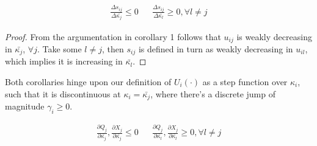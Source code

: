 \documentclass[../main.tex]{subfiles}
\begin{document}
\begin{corollary}
\begin{align*}
    \frac{\Delta s_{ij}}{\Delta\bar{\kappa_{j}}} \leq 0 &&  \frac{\Delta s_{ij}}{\Delta\bar{\kappa_{l}}} \geq 0, \forall l \neq j
\end{align*}   
\end{corollary}

\begin{proof}
From the argumentation in corollary 1 follows that $u_{ij}$ is weakly decreasing in $\bar{\kappa_j}$, $\forall j$. Take some $l \neq j$, then $s_{ij}$ is defined in turn as weakly decreasing in $u_{il}$, which implies it is increasing in $\bar{\kappa_l}$.
\end{proof}

Both corollaries hinge upon our definition of $U_i(\cdot)$ as a step function over $\kappa_i$, such that it is discontinuous at $\kappa_i = \bar{\kappa_j}$, where there's a discrete jump of magnitude  $\gamma_i \geq 0$.

\begin{corollary}
\begin{align*}
    \frac{\partial Q_{j}}{\partial\bar{\kappa_{j}}},\frac{\partial X_{j}}{\partial\bar{\kappa_{j}}} \leq 0 &&  \frac{\partial Q_{j}}{\partial\bar{\kappa_{l}}}, \frac{\partial X_{j}}{\partial\bar{\kappa_{l}}} \geq 0, \forall l \neq j
\end{align*}
\end{corollary}
\end{document}
